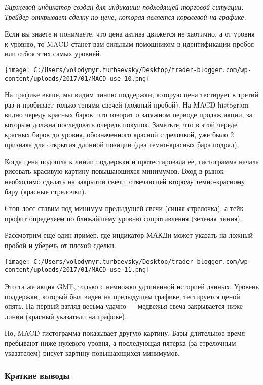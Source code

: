 \documentclass[a5paper]{article}
\begin{document}
    \emph{Биржевой индикатор создан для индикации подходящей торговой ситуации. Трейдер открывает сделку по цене, которая является королевой на графике.}

Если вы знаете и понимаете, что цена актива движется не хаотично, а от
уровня к уровню, то MACD станет вам сильным помощником в идентификации
пробоя или отбоя этих самых уровней.

\texttt{[image: C:/Users/volodymyr.turbaevsky/Desktop/trader-blogger.com/wp-content/uploads/2017/01/MACD-use-10.png]}

На графике выше, мы видим линию поддержки, которую цена тестирует в третий раз и пробивает только тенями свечей (ложный пробой). На MACD histogram  видно череду красных баров, что говорит о затяжном периоде продаж акции, за которым должна последовать очередь покупок. Заметьте, что в этой череде красных баров до уровня, обозначенного красной стрелочкой, уже было 2 признака для открытия длинной позиции (два темно-красных бара подряд).

Когда цена подошла к линии поддержки и протестировала ее, гистограмма начала рисовать красивую картину повышающихся минимумов. Вход в рынок необходимо сделать на закрытии свечи, отвечающей второму темно-красному бару (красные стрелочки).

Стоп лосс ставим под минимум предыдущей свечи (синяя стрелочка), а тейк профит определяем по ближайшему уровню сопротивления (зеленая линия).

Рассмотрим еще один пример, где индикатор МАКДи может указать на
ложный пробой и уберечь от плохой сделки.

\texttt{[image: C:/Users/volodymyr.turbaevsky/Desktop/trader-blogger.com/wp-content/uploads/2017/01/MACD-use-11.png]}

Это та же акция GME, только с немножко удлиненной историей данных. Уровень поддержки, который был виден на предыдущем графике, тестируется ценой опять. На первый взгляд весьма удачно — медвежья свеча закрывается ниже линии (красный указатели на графике).

Но, MACD гистограмма показывает другую картину. Бары длительное время
пребывают ниже нулевого уровня, а последующая пятерка (за стрелочным
указателем) рисует картину повышающихся минимумов.

\subsubsection{Краткие выводы}
\end{document}
